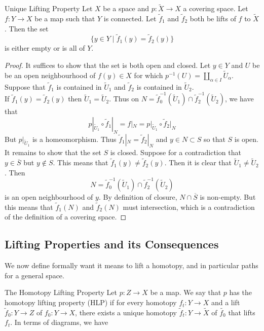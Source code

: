 \documentclass[a4paper]{article}
\begin{document}
\begin{prp}{Unique Lifting Property}{} Let $X$ be a space and $p:\widetilde{X}\to X$ a covering space. Let $f:Y\to X$ be a map such that $Y$ is connected. Let $\widetilde{f}_1$ and $\widetilde{f}_2$ both be lifts of $f$ to $\widetilde{X}$. Then the set $$\{y\in Y\;|\;\widetilde{f}_1(y)=\widetilde{f}_2(y)\}$$ is either empty or is all of $Y$. 
\begin{proof}
It suffices to show that the set is both open and closed. Let $y\in Y$ and $U$ be be an open neighbourhood of $f(y)\in X$ for which $p^{-1}(U)=\amalg_{\alpha\in I}\widetilde{U}_\alpha$. Suppose that $\widetilde{f}_1$ is contained in $\widetilde{U}_1$ and $\widetilde{f}_2$ is contained in $\widetilde{U}_2$.  \\

If $\widetilde{f}_1(y)=\widetilde{f}_2(y)$ then $\widetilde{U}_1=\widetilde{U}_2$. Thus on $N=\widetilde{f}_0^{-1}(\widetilde{U}_1)\cap\widetilde{f}_2^{-1}(\widetilde{U}_2)$, we have that $$p|_{\widetilde{U}_1}\circ\widetilde{f}_1|_N=f|_N=p|_{\widetilde{U}_1}\circ\widetilde{f}_2|_N$$ But $p|_{\widetilde{U}_1}$ is a homeomorphism. Thus $\widetilde{f}_1|_N=\widetilde{f}_2|_N$ and $y\in N\subset S$ so that $S$ is open. \\

It remains to show that the set $S$ is closed. Suppose for a contradiction that $y\in\overline{S}$ but $y\notin S$. This means that $\widetilde{f}_1(y)\neq\widetilde{f}_2(y)$. Then it is clear that $\widetilde{U}_1\neq\widetilde{U}_2$. Then $$N=\widetilde{f}_0^{-1}(\widetilde{U}_1)\cap\widetilde{f}_2^{-1}(\widetilde{U}_2)$$ is an open neighbourhood of $y$. By definition of closure, $N\cap\overline{S}$ is non-empty. But this means that $\widetilde{f}_1(N)$ and $\widetilde{f}_2(N)$ must intersection, which is a contradiction of the definition of a covering space. 
\end{proof}
\end{prp}

\subsection{Lifting Properties and its Consequences}
We now define formally want it means to lift a homotopy, and in particular paths for a general space. 

\begin{defn}{The Homotopy Lifting Property}{} Let $p:Z\to X$ be a map. We say that $p$ has the homotopy lifting property (HLP) if for every homotopy $f_t:Y\to X$ and a lift $\widetilde{f}_0:Y\to Z$ of $f_0:Y\to X$, there exists a unique homotopy $\widetilde{f}_t:Y\to\widetilde{X}$ of $\widetilde{f_0}$ that lifts $f_t$. In terms of diagrams, we have \\
\end{defn}
\end{document}
